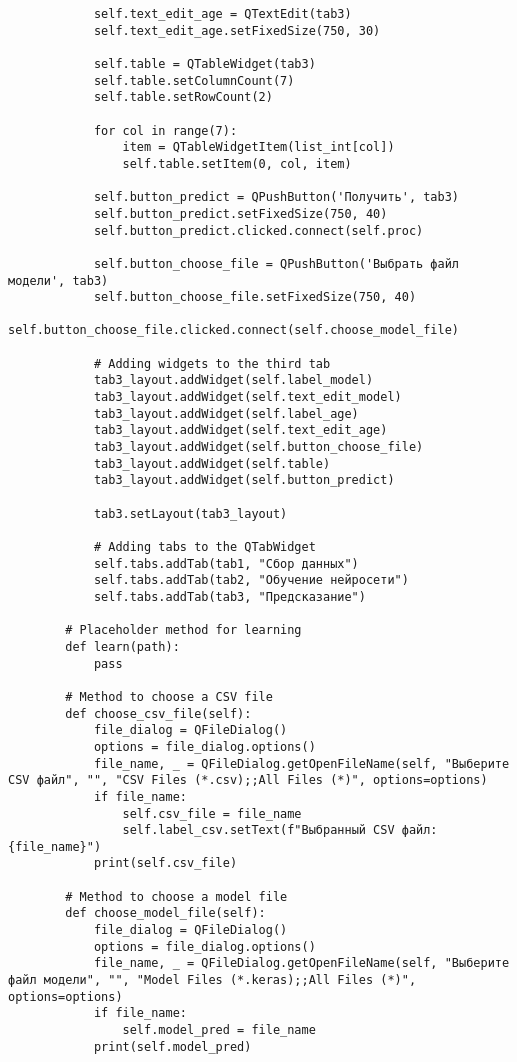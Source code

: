 \begin{lstlisting}
            self.text_edit_age = QTextEdit(tab3)
            self.text_edit_age.setFixedSize(750, 30)

            self.table = QTableWidget(tab3)
            self.table.setColumnCount(7)
            self.table.setRowCount(2)

            for col in range(7):
                item = QTableWidgetItem(list_int[col])
                self.table.setItem(0, col, item)

            self.button_predict = QPushButton('Получить', tab3)
            self.button_predict.setFixedSize(750, 40)
            self.button_predict.clicked.connect(self.proc)

            self.button_choose_file = QPushButton('Выбрать файл модели', tab3)
            self.button_choose_file.setFixedSize(750, 40)
            self.button_choose_file.clicked.connect(self.choose_model_file)

            # Adding widgets to the third tab
            tab3_layout.addWidget(self.label_model)
            tab3_layout.addWidget(self.text_edit_model)
            tab3_layout.addWidget(self.label_age)
            tab3_layout.addWidget(self.text_edit_age)
            tab3_layout.addWidget(self.button_choose_file)
            tab3_layout.addWidget(self.table)
            tab3_layout.addWidget(self.button_predict)

            tab3.setLayout(tab3_layout)

            # Adding tabs to the QTabWidget
            self.tabs.addTab(tab1, "Сбор данных")
            self.tabs.addTab(tab2, "Обучение нейросети")
            self.tabs.addTab(tab3, "Предсказание")

        # Placeholder method for learning
        def learn(path):
            pass

        # Method to choose a CSV file
        def choose_csv_file(self):
            file_dialog = QFileDialog()
            options = file_dialog.options()
            file_name, _ = QFileDialog.getOpenFileName(self, "Выберите CSV файл", "", "CSV Files (*.csv);;All Files (*)", options=options)
            if file_name:
                self.csv_file = file_name
                self.label_csv.setText(f"Выбранный CSV файл: {file_name}")
            print(self.csv_file)

        # Method to choose a model file
        def choose_model_file(self):
            file_dialog = QFileDialog()
            options = file_dialog.options()
            file_name, _ = QFileDialog.getOpenFileName(self, "Выберите файл модели", "", "Model Files (*.keras);;All Files (*)", options=options)
            if file_name:
                self.model_pred = file_name 
            print(self.model_pred)
            

\end{lstlisting}
